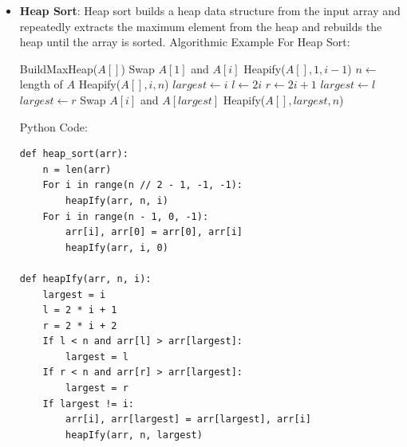 \documentclass[12pt]{book} %
\begin{document}
\begin{itemize}
\begin{verbatim}
def partition(arr, start, end):
    pivot = arr[end]
    i = start - 1
    For j in range(start, end):
        If arr[j] < pivot:
            i += 1
            arr[i], arr[j] = arr[j], arr[i]
    arr[i + 1], arr[end] = arr[end], arr[i + 1]
    Return i + 1
\end{verbatim}
    \FloatBarrier %
    \item \textbf{Heap Sort}: Heap sort builds a heap data structure from the input array and repeatedly extracts the maximum element from the heap and rebuilds the heap until the array is sorted.
    Algorithmic Example For Heap Sort:
     \FloatBarrier %
     \begin{algorithm}
\caption{Heap Sort}
\begin{algorithmic}[1]
    \State BuildMaxHeap($A[]$)
        \State Swap $A[1]$ and $A[i]$
        \State Heapify($A[], 1, i-1$)
    \EndFor
\EndFunction
\FloatBarrier %
    \State $n \gets$ length of $A$
        \State Heapify($A[], i, n$)
    \EndFor
\EndFunction
\FloatBarrier %
    \State $largest \gets i$
    \State $l \gets 2i$
    \State $r \gets 2i + 1$
        \State $largest \gets l$
    \EndIf
        \State $largest \gets r$
    \EndIf
        \State Swap $A[i]$ and $A[largest]$
        \State Heapify($A[], largest, n$)
    \EndIf
\EndFunction
\end{algorithmic}
\end{algorithm}
\FloatBarrier %
Python Code:
\FloatBarrier %
\begin{verbatim}
def heap_sort(arr):
    n = len(arr)
    For i in range(n // 2 - 1, -1, -1):
        heapIfy(arr, n, i)
    For i in range(n - 1, 0, -1):
        arr[i], arr[0] = arr[0], arr[i]
        heapIfy(arr, i, 0)

def heapIfy(arr, n, i):
    largest = i
    l = 2 * i + 1
    r = 2 * i + 2
    If l < n and arr[l] > arr[largest]:
        largest = l
    If r < n and arr[r] > arr[largest]:
        largest = r
    If largest != i:
        arr[i], arr[largest] = arr[largest], arr[i]
        heapIfy(arr, n, largest)
\end{verbatim}
\end{itemize}
\FloatBarrier %
\end{document}

